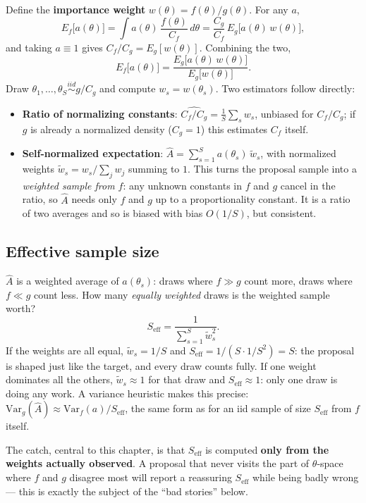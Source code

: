 \documentclass[
  letterpaper,
  DIV=11,
  numbers=noendperiod]{scrreprt}
\providecommand{\tightlist}{%
  \setlength{\itemsep}{0pt}\setlength{\parskip}{0pt}}
\begin{document}
Define the \textbf{importance weight}
\(w(\theta) = f(\theta)/g(\theta)\). For any \(a\), \[
E_f\big[a(\theta)\big]
= \int a(\theta)\,\frac{f(\theta)}{C_f}\,d\theta
= \frac{C_g}{C_f}\, E_g\big[a(\theta)\,w(\theta)\big],
\] and taking \(a \equiv 1\) gives \(C_f/C_g = E_g[w(\theta)]\).
Combining the two, \[
E_f\big[a(\theta)\big] = \frac{E_g\big[a(\theta)\,w(\theta)\big]}{E_g\big[w(\theta)\big]}.
\] Draw \(\theta_1,\ldots,\theta_S \overset{iid}{\sim} g/C_g\) and
compute \(w_s = w(\theta_s)\). Two estimators follow directly:

\begin{itemize}
\tightlist
\item
  \textbf{Ratio of normalizing constants}:
  \(\widehat{C_f/C_g} = \frac1S\sum_s w_s\), unbiased for \(C_f/C_g\);
  if \(g\) is already a normalized density (\(C_g=1\)) this estimates
  \(C_f\) itself.
\item
  \textbf{Self-normalized expectation}:
  \(\hat A = \sum_{s=1}^S a(\theta_s)\,\tilde w_s\), with normalized
  weights \(\tilde w_s = w_s / \sum_j w_j\) summing to \(1\). This turns
  the proposal sample into a \emph{weighted sample from \(f\)}: any
  unknown constants in \(f\) and \(g\) cancel in the ratio, so
  \(\hat A\) needs only \(f\) and \(g\) up to a proportionality
  constant. It is a ratio of two averages and so is biased with bias
  \(O(1/S)\), but consistent.
\end{itemize}

\subsection{Effective sample size}\label{effective-sample-size}

\(\hat A\) is a weighted average of \(a(\theta_s)\): draws where
\(f \gg g\) count more, draws where \(f \ll g\) count less. How many
\emph{equally weighted} draws is the weighted sample worth? \[
S_{\text{eff}} = \frac{1}{\displaystyle\sum_{s=1}^S \tilde w_s^2}.
\] If the weights are all equal, \(\tilde w_s = 1/S\) and
\(S_{\text{eff}} =
1/(S \cdot 1/S^2) = S\): the proposal is shaped just like the target,
and every draw counts fully. If one weight dominates all the others,
\(\tilde w_s
\approx 1\) for that draw and \(S_{\text{eff}} \approx 1\): only one
draw is doing any work. A variance heuristic makes this precise:
\(\text{Var}_g(\hat A) \approx \text{Var}_f(a)/S_{\text{eff}}\), the
same form as for an iid sample of size \(S_{\text{eff}}\) from \(f\)
itself.

The catch, central to this chapter, is that \(S_{\text{eff}}\) is
computed \textbf{only from the weights actually observed}. A proposal
that never visits the part of \(\theta\)-space where \(f\) and \(g\)
disagree most will report a reassuring \(S_{\text{eff}}\) while being
badly wrong --- this is exactly the subject of the ``bad stories''
below.
\end{document}

